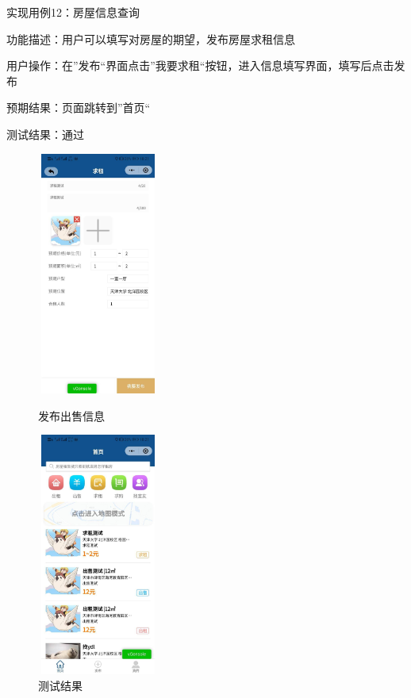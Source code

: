 实现用例12：房屋信息查询

功能描述：用户可以填写对房屋的期望，发布房屋求租信息

用户操作：在”发布“界面点击”我要求租“按钮，进入信息填写界面，填写后点击发布

预期结果：页面跳转到”首页“

测试结果：通过
\begin{figure}[htbp]
    \centering
    \begin{minipage}[t]{0.48\textwidth}
    \centering
    \includegraphics[width=4cm,height=8cm]{test/image/test30.png} 
 
   \caption{发布出售信息} 
    \end{minipage}
    \begin{minipage}[t]{0.48\textwidth}
    \centering
    \includegraphics[width=4cm,height=8cm]{test/image/test31.png}
    \caption{测试结果}
    \end{minipage}
    \end{figure}
   \newpage 

